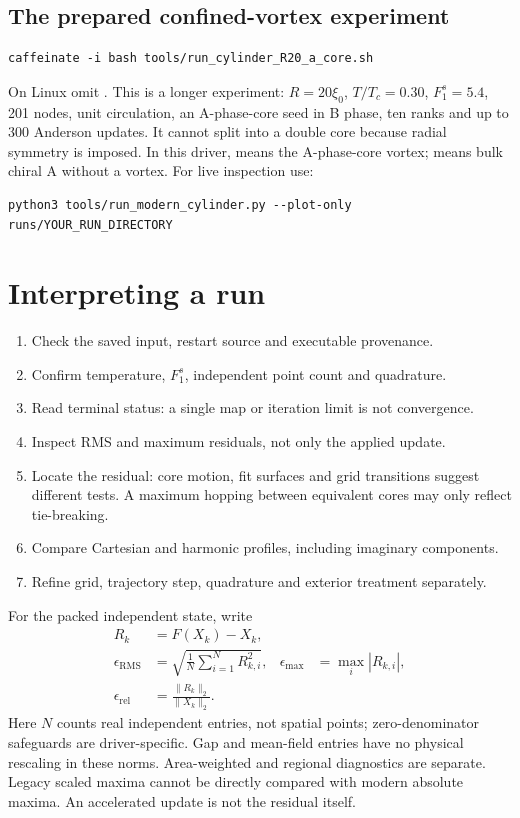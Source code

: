\documentclass[11pt,a4paper]{article}
\let\file\path
\begin{document}
\subsection{The prepared confined-vortex experiment}
\begin{lstlisting}
caffeinate -i bash tools/run_cylinder_R20_a_core.sh
\end{lstlisting}
On Linux omit \file{caffeinate}. This is a longer experiment: $R=20\xi_0$,
$T/T_c=0.30$, $F_1^s=5.4$, 201 nodes, unit circulation, an A-phase-core seed
in B phase, ten ranks and up to 300 Anderson updates. It cannot split into
a double core because radial symmetry is imposed. In this driver,
\file{initialization=1} means the A-phase-core vortex; \file{-2} means
bulk chiral A without a vortex. For live inspection use:
\begin{lstlisting}
python3 tools/run_modern_cylinder.py --plot-only runs/YOUR_RUN_DIRECTORY
\end{lstlisting}

\section{Interpreting a run}
\begin{enumerate}
\item Check the saved input, restart source and executable provenance.
\item Confirm temperature, $F_1^s$, independent point count and quadrature.
\item Read terminal status: a single map or iteration limit is not convergence.
\item Inspect RMS and maximum residuals, not only the applied update.
\item Locate the residual: core motion, fit surfaces and grid transitions
suggest different tests. A maximum hopping between equivalent cores may only
reflect tie-breaking.
\item Compare Cartesian and harmonic profiles, including imaginary components.
\item Refine grid, trajectory step, quadrature and exterior treatment separately.
\end{enumerate}

For the packed independent state, write
\begin{align}
R_k&=F(X_k)-X_k,\\
\epsilon_{\mathrm{RMS}}&=\sqrt{\frac{1}{N}\sum_{i=1}^N R_{k,i}^2},&
\epsilon_{\max}&=\max_i|R_{k,i}|,\\
\epsilon_{\mathrm{rel}}&=\frac{\lVert R_k\rVert_2}{\lVert X_k\rVert_2}.
\end{align}
Here $N$ counts real independent entries, not spatial points; zero-denominator
safeguards are driver-specific. Gap and mean-field entries have no physical
rescaling in these norms. Area-weighted and regional diagnostics are separate.
Legacy scaled maxima cannot be directly compared with modern absolute maxima.
An accelerated update is not the residual itself.
\end{document}
